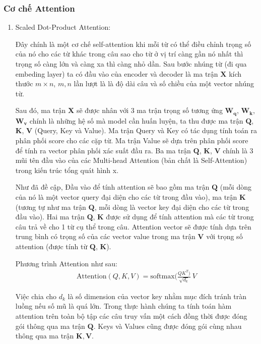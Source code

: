 \subsubsection{Cơ chế Attention}
\begin{enumerate}[label=\textbf{\arabic*}]
    \item Scaled Dot-Product Attention:

    Đây chính là một cơ chế self-attention khi mỗi từ có thể điều chỉnh trọng số của nó cho các từ khác trong câu sao cho từ ở vị trí càng gần nó nhất thì trọng số càng lớn và càng xa thì càng nhỏ dần. Sau bước nhúng từ (đi qua embeding layer) ta có đầu vào của encoder và decoder là ma trận $\mathbf{X}$ kích thước $m\times n$, $m,n$ lần lượt là là độ dài câu và số chiều của một vector nhúng từ.

    Sau đó, ma trận $\mathbf{X}$ sẽ được nhân với 3 ma trận trọng số tương ứng $\mathbf{W}_\mathbf{q}$, $\mathbf{W}_\mathbf{k}$, $\mathbf{W}_\mathbf{v}$ chính là những hệ số mà model cần huấn luyện, ta thu được ma trận $\mathbf{Q}$, $\mathbf{K}$, $\mathbf{V}$ (Query, Key và Value). Ma trận Query và Key có tác dụng tính toán ra phân phối score cho các cặp từ. Ma trận Value sẽ dựa trên phân phối score để tính ra vector phân phối xác suất đầu ra. Ba ma trận $\mathbf{Q}$, $\mathbf{K}$, $\mathbf{V}$ chính là 3 mũi tên đầu vào của các Multi-head Attention (bản chất là Self-Attention) trong kiến trúc tổng quát hình x.

    Như đã đề cập, Đầu vào để tính attention sẽ bao gồm ma trận $\mathbf{Q}$ (mỗi dòng của nó là một vector query đại diện cho các từ trong đầu vào), ma trận $\mathbf{K}$ (tương tự như ma trận $\mathbf{Q}$, mỗi dòng là vector key đại diện cho các từ trong đầu vào). Hai ma trận $\mathbf{Q}$, $\mathbf{K}$ được sử dụng để tính attention mà các từ trong câu trả về cho 1 từ cụ thể trong câu. Attention vector sẽ được tính dựa trên trung bình có trọng số của các vector value trong ma trận $\mathbf{V}$ với trọng số attention (được tính từ $\mathbf{Q}$, $\mathbf{K}$).

    Phương trình Attention như sau:
    \begin{align}
        \mathrm{Attention}({Q, K, V}) = \mathrm{softmax}(\frac{{QK^T})}{\sqrt{d_k}}\ {V} \tag{xxx}
    \end{align}

    Việc chia cho $d_k$ là số dimension của vector key nhằm mục đích tránh tràn luồng nếu số mũ là quá lớn.
    Trong thực hành chúng ta tính toán hàm attention trên toàn bộ tập các câu truy vấn một cách đồng thời được đóng gói thông qua ma trận $\mathbf{Q}$. Keys và Values cũng được đóng gói cùng nhau thông qua ma trận $\mathbf{K},\mathbf{V}$.


\end{enumerate}
